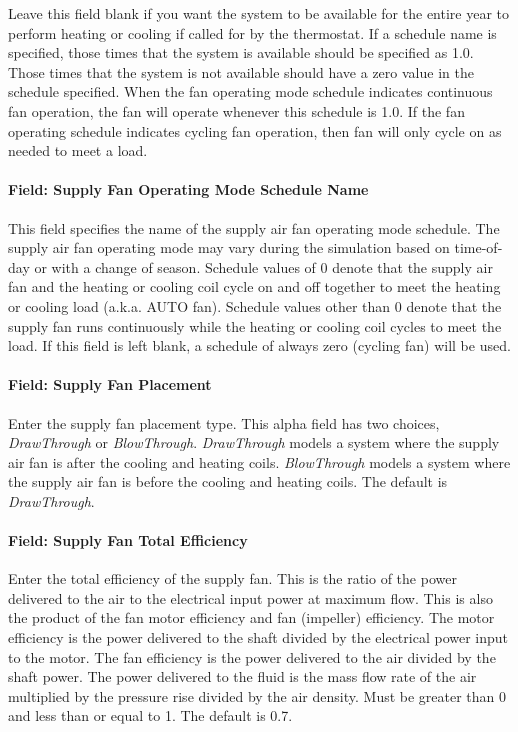 Leave this field blank if you want the system to be available for the entire year to perform heating or cooling if called for by the thermostat. If a schedule name is specified, those times that the system is available should be specified as 1.0. Those times that the system is not available should have a zero value in the schedule specified. When the fan operating mode schedule indicates continuous fan operation, the fan will operate whenever this schedule is 1.0. If the fan operating schedule indicates cycling fan operation, then fan will only cycle on as needed to meet a load.

\paragraph{Field: Supply Fan Operating Mode Schedule Name}\label{field-supply-fan-operating-mode-schedule-name-3}

This field specifies the name of the supply air fan operating mode schedule. The supply air fan operating mode may vary during the simulation based on time-of-day or with a change of season. Schedule values of 0 denote that the supply air fan and the heating or cooling coil cycle on and off together to meet the heating or cooling load (a.k.a. AUTO fan). Schedule values other than 0 denote that the supply fan runs continuously while the heating or cooling coil cycles to meet the load. If this field is left blank, a schedule of always zero (cycling fan) will be used.

\paragraph{Field: Supply Fan Placement}\label{field-supply-fan-placement-3}

Enter the supply fan placement type. This alpha field has two choices, \emph{DrawThrough} or \emph{BlowThrough}. \emph{DrawThrough} models a system where the supply air fan is after the cooling and heating coils. \emph{BlowThrough} models a system where the supply air fan is before the cooling and heating coils. The default is \emph{DrawThrough}.

\paragraph{Field: Supply Fan Total Efficiency}\label{field-supply-fan-total-efficiency-4}

Enter the total efficiency of the supply fan. This is the ratio of the power delivered to the air to the electrical input power at maximum flow. This is also the product of the fan motor efficiency and fan (impeller) efficiency. The motor efficiency is the power delivered to the shaft divided by the electrical power input to the motor. The fan efficiency is the power delivered to the air divided by the shaft power. The power delivered to the fluid is the mass flow rate of the air multiplied by the pressure rise divided by the air density. Must be greater than 0 and less than or equal to 1. The default is 0.7.

